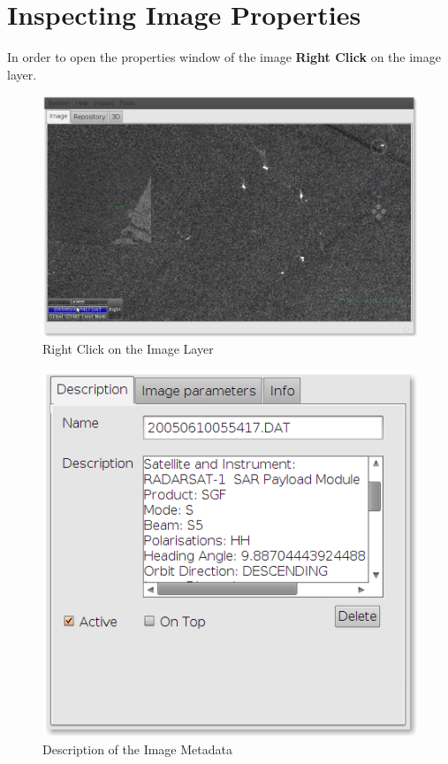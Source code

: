 \documentclass[12pt,a4paper,final]{report}
\begin{document}
\section{Inspecting Image Properties}
In order to open the properties window of the image \textbf{Right Click} on the image layer.
\begin{figure}[H]
 \centering
 \includegraphics[scale=0.45,keepaspectratio=true]{./images/ImageProperties1.png}
 \caption{Right Click on the Image Layer}
\end{figure}
\begin{figure}[H]
 \centering
 \includegraphics[scale=0.45,keepaspectratio=true]{./images/ImageProperties2.png}
 \caption{Description of the Image Metadata}
\end{figure}
\end{document}
